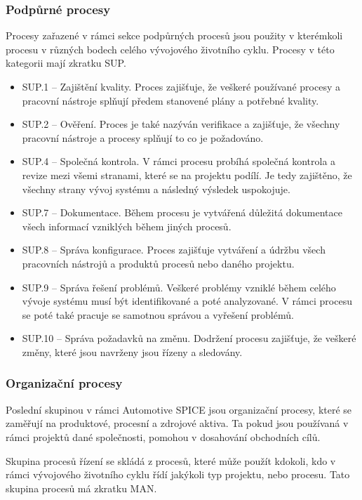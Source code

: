 \documentclass[czech,master,public,dept460,male,cpdeclaration,oneside]{diploma}
\begin{document}
\subsubsection{Podpůrné procesy}
Procesy zařazené v rámci sekce podpůrných procesů jsou použity v kterémkoli procesu v různých bodech celého vývojového životního cyklu. Procesy v této kategorii mají zkratku SUP.

\begin{itemize}
	\item SUP.1 -- Zajištění kvality. Proces zajišťuje, že veškeré používané procesy a pracovní nástroje splňují předem stanovené plány a potřebné kvality.
	\item SUP.2 -- Ověření. Proces je také nazýván verifikace a zajišťuje, že všechny pracovní nástroje a procesy splňují to co je požadováno.
	\item SUP.4 -- Společná kontrola. V rámci procesu probíhá společná kontrola a revize mezi všemi stranami, které se na projektu podílí. Je tedy zajištěno, že všechny strany vývoj systému a následný výsledek uspokojuje.
	\item SUP.7 -- Dokumentace. Během procesu je vytvářená důležitá dokumentace všech informací vzniklých během jiných procesů.
	\item SUP.8 -- Správa konfigurace. Proces zajišťuje vytváření a údržbu všech pracovních nástrojů a produktů procesů nebo daného projektu.
	\item SUP.9 -- Správa řešení problémů. Veškeré problémy vzniklé během celého vývoje systému musí být identifikované a poté analyzované. V rámci procesu se poté také pracuje se samotnou správou a vyřešení problémů. 
	\item SUP.10 -- Správa požadavků na změnu. Dodržení procesu zajišťuje, že veškeré změny, které jsou navrženy jsou řízeny a sledovány.
\end{itemize}

\subsubsection{Organizační procesy}
Poslední skupinou v rámci Automotive SPICE jsou organizační procesy, které se zaměřují na produktové, procesní a zdrojové aktiva. Ta pokud jsou používaná v rámci projektů dané společnosti, pomohou v dosahování obchodních cílů.

Skupina procesů řízení se skládá z procesů, které může použít kdokoli, kdo v rámci vývojového životního cyklu řídí jakýkoli typ projektu, nebo procesu. Tato skupina procesů má zkratku MAN.
\end{document}
